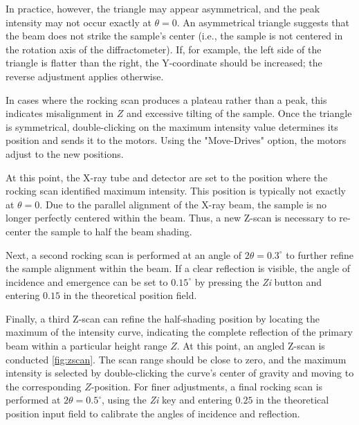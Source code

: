 In practice, however, the triangle may appear asymmetrical, and the peak intensity may not occur exactly at \( \theta = 0 \). An asymmetrical triangle suggests that the beam does not strike the sample’s center (i.e., the sample is not centered in the rotation axis of the diffractometer). If, for example, the left side of the triangle is flatter than the right, the Y-coordinate should be increased; the reverse adjustment applies otherwise.

In cases where the rocking scan produces a plateau rather than a peak, this indicates misalignment in \( Z \) and excessive tilting of the sample. Once the triangle is symmetrical, double-clicking on the maximum intensity value determines its position and sends it to the motors. Using the "Move-Drives" option, the motors adjust to the new positions.

At this point, the X-ray tube and detector are set to the position where the rocking scan identified maximum intensity. This position is typically not exactly at \( \theta = 0 \). Due to the parallel alignment of the X-ray beam, the sample is no longer perfectly centered within the beam. Thus, a new Z-scan is necessary to re-center the sample to half the beam shading.

Next, a second rocking scan is performed at an angle of \( 2\theta = 0.3^\circ \) to further refine the sample alignment within the beam. If a clear reflection is visible, the angle of incidence and emergence can be set to \( 0.15^\circ \) by pressing the \textit{Zi} button and entering \( 0.15 \) in the theoretical position field.

Finally, a third Z-scan can refine the half-shading position by locating the maximum of the intensity curve, indicating the complete reflection of the primary beam within a particular height range \( Z \). At this point, an angled Z-scan is conducted \autoref{fig:zscan}. The scan range should be close to zero, and the maximum intensity is selected by double-clicking the curve’s center of gravity and moving to the corresponding \( Z \)-position. For finer adjustments, a final rocking scan is performed at \( 2\theta = 0.5^\circ \), using the \textit{Zi} key and entering \( 0.25 \) in the theoretical position input field to calibrate the angles of incidence and reflection.



